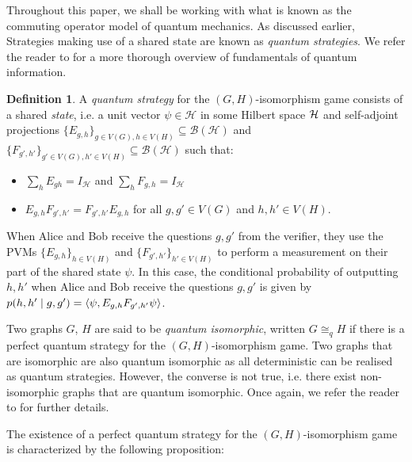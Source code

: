 \documentclass[11pt,a4paper]{article}
\theoremstyle{plain}
\theoremstyle{remark}
\theoremstyle{definition}
\newtheorem{definition}[thm]{Definition}
\begin{document}
Throughout this paper, we shall be working with what is known as the commuting operator model of quantum mechanics. As discussed earlier, Strategies making use of a shared state are known as \emph{quantum strategies}.
We refer the reader to \cite{Nielsen_Chuang_2010} for a more thorough overview of fundamentals of quantum information.
\begin{definition}
A \emph{quantum strategy} for the $(G,H)$-isomorphism game consists of a shared \emph{state}, i.e. a unit vector $\psi \in \mathcal{H}$ in some Hilbert space ${\mathcal H}$ and self-adjoint projections $\{E_{g,h}\}_{g\in V(G), h\in V(H)} \subseteq \mathcal{B(H)}$ and $\{F_{g',h'}\}_{g'\in V(G), h'\in V(H)} \subseteq \mathcal{B(H)}$ such that: 
\begin{itemize}
    \item $\sum_{h} E_{gh} = I_{\mathcal{H}}$ and $\sum_{h} F_{g,h} =I_{\mathcal{H}}$ \item $E_{g,h}F_{g',h'} = F_{g',h'}E_{g,h}$ for all $g,g'\in V(G)$ and $h,h'\in V(H)$. 
\end{itemize}

 

When Alice and Bob receive the questions $g,g'$ from the verifier, they use the PVMs $\{E_{g,h}\}_{h\in V(H)}$ and $\{F_{g',h'}\}_{h'\in V(H)}$ to perform a measurement on their part of the shared state $\psi$. In this case, the conditional probability of outputting $h,h'$ when Alice and Bob receive the questions $g,g'$ is given by $p(h,h'\mid g,g') = \braket{\psi, E_{g,h}F_{g',h'} \psi}$. 
\end{definition}

Two graphs $G$, $H$ are said to be \emph{quantum isomorphic}, written $G \cong_q H$ if there is a perfect quantum strategy for the $(G,H)$-isomorphism game. Two graphs that are isomorphic are also quantum isomorphic as all deterministic can be realised as quantum strategies. However, the converse is not true, i.e. there exist non-isomorphic graphs that are quantum isomorphic. Once again, we refer the reader to \cite{ATSERIAS2019289} for further details. 

The existence of a perfect quantum strategy for the $(G,H)$-isomorphism game is characterized by the following proposition:
\end{document}
